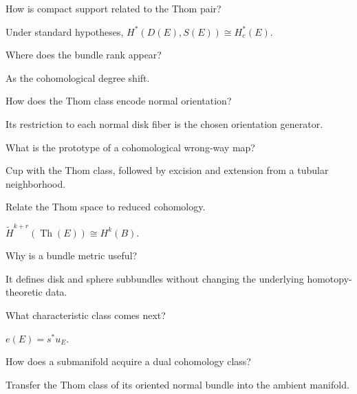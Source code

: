 \begin{problem}
How is compact support related to the Thom pair?
\end{problem}
\begin{solution}
Under standard hypotheses, $H^*(D(E),S(E))\cong H_c^*(E)$.
\end{solution}

\begin{problem}
Where does the bundle rank appear?
\end{problem}
\begin{solution}
As the cohomological degree shift.
\end{solution}

\begin{problem}
How does the Thom class encode normal orientation?
\end{problem}
\begin{solution}
Its restriction to each normal disk fiber is the chosen orientation generator.
\end{solution}

\begin{problem}
What is the prototype of a cohomological wrong-way map?
\end{problem}
\begin{solution}
Cup with the Thom class, followed by excision and extension from a tubular neighborhood.
\end{solution}

\begin{problem}
Relate the Thom space to reduced cohomology.
\end{problem}
\begin{solution}
$\widetilde H^{k+r}(\operatorname{Th}(E))\cong H^k(B)$.
\end{solution}

\begin{problem}
Why is a bundle metric useful?
\end{problem}
\begin{solution}
It defines disk and sphere subbundles without changing the underlying homotopy-theoretic data.
\end{solution}

\begin{problem}
What characteristic class comes next?
\end{problem}
\begin{solution}
$e(E)=s^*u_E$.
\end{solution}

\begin{problem}
How does a submanifold acquire a dual cohomology class?
\end{problem}
\begin{solution}
Transfer the Thom class of its oriented normal bundle into the ambient manifold.
\end{solution}


